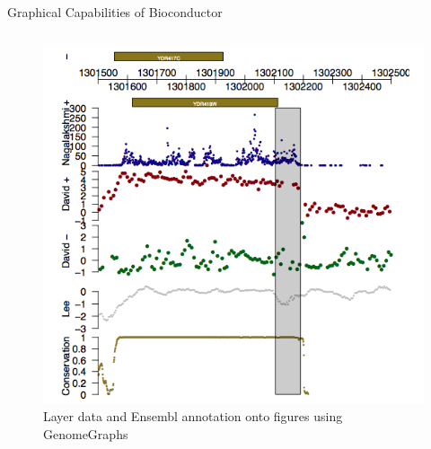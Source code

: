 \documentclass[final]{beamer}
\begin{document}
\begin{frame}[t]
\begin{columns}[t]
\begin{column}{0.48\linewidth}
\begin{block}{Graphical Capabilities of Bioconductor}
\begin{columns}[t]
\begin{column}{0.33\linewidth}
\begin{figure}
              \includegraphics[width=0.85\linewidth]{genomegraphs}
              \caption{Layer data and Ensembl annotation onto figures using GenomeGraphs}
            \end{figure}
          \end{column}
        \end{columns}
      \end{block}


\end{column}
\end{columns}
\end{frame}
\end{document}
